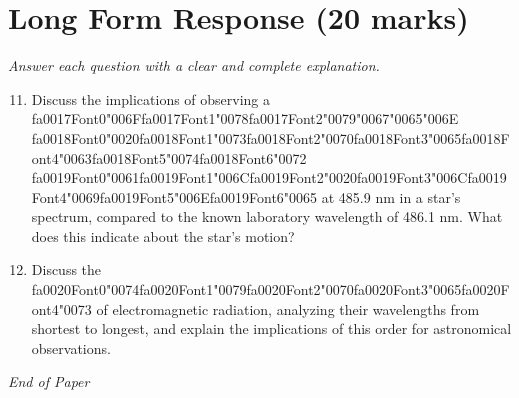 \documentclass[12pt]{article}
\begin{document}
\section*{Long Form Response (20 marks)}
\textit{Answer each question with a clear and complete explanation.}
\begin{enumerate}[label=\arabic*.]
\setcounter{enumi}{10}
\item Discuss the implications of observing a {\csname fa0017Font0\endcsname\char"006F}{\csname fa0017Font1\endcsname\char"0078}{\csname fa0017Font2\endcsname\char"0079}{\char"0067}{\char"0065}{\char"006E} {\csname fa0018Font0\endcsname\char"0020}{\csname fa0018Font1\endcsname\char"0073}{\csname fa0018Font2\endcsname\char"0070}{\csname fa0018Font3\endcsname\char"0065}{\csname fa0018Font4\endcsname\char"0063}{\csname fa0018Font5\endcsname\char"0074}{\csname fa0018Font6\endcsname\char"0072} {\csname fa0019Font0\endcsname\char"0061}{\csname fa0019Font1\endcsname\char"006C}{\csname fa0019Font2\endcsname\char"0020}{\csname fa0019Font3\endcsname\char"006C}{\csname fa0019Font4\endcsname\char"0069}{\csname fa0019Font5\endcsname\char"006E}{\csname fa0019Font6\endcsname\char"0065} at 485.9 nm in a star's
spectrum, compared to the known laboratory wavelength of 486.1 nm. What does this indicate
about the star's motion?
\item Discuss the {\csname fa0020Font0\endcsname\char"0074}{\csname fa0020Font1\endcsname\char"0079}{\csname fa0020Font2\endcsname\char"0070}{\csname fa0020Font3\endcsname\char"0065}{\csname fa0020Font4\endcsname\char"0073} of electromagnetic radiation, analyzing their wavelengths from
shortest to longest, and explain the implications of this order for astronomical
observations.
\end{enumerate}

\vfill
\noindent\textit{End of Paper}
\end{document}
